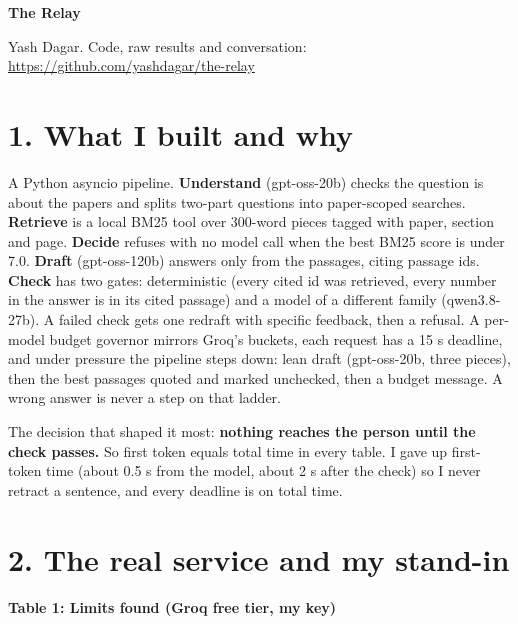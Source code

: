 \documentclass[10pt]{article}
\begin{document}
\small
\begin{center}{\large\textbf{The Relay}}\end{center}

Yash Dagar. Code, raw results and conversation: \url{https://github.com/yashdagar/the-relay}

\section*{1. What I built and why}

A Python asyncio pipeline. \textbf{Understand} (gpt-oss-20b) checks the question is about the papers and splits two-part questions into paper-scoped searches. \textbf{Retrieve} is a local BM25 tool over 300-word pieces tagged with paper, section and page. \textbf{Decide} refuses with no model call when the best BM25 score is under 7.0. \textbf{Draft} (gpt-oss-120b) answers only from the passages, citing passage ids. \textbf{Check} has two gates: deterministic (every cited id was retrieved, every number in the answer is in its cited passage) and a model of a different family (qwen3.8-27b). A failed check gets one redraft with specific feedback, then a refusal. A per-model budget governor mirrors Groq's buckets, each request has a 15 s deadline, and under pressure the pipeline steps down: lean draft (gpt-oss-20b, three pieces), then the best passages quoted and marked unchecked, then a budget message. A wrong answer is never a step on that ladder.

The decision that shaped it most: \textbf{nothing reaches the person until the check passes.} So first token equals total time in every table. I gave up first-token time (about 0.5 s from the model, about 2 s after the check) so I never retract a sentence, and every deadline is on total time.

\section*{2. The real service and my stand-in}

\textbf{Table 1: Limits found (Groq free tier, my key)}
\end{document}

